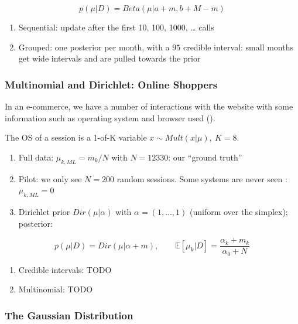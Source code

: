 \documentclass{article}
\begin{document}
\[p(\mu | D) = Beta(\mu | a + m, b + M - m)\]

\begin{enumerate}
\def\labelenumi{\arabic{enumi}.}
\setcounter{enumi}{3}
\item
  Sequential: update after the first 10, 100, 1000, \ldots{} calls
\item
  Grouped: one posterior per month, with a \(95%
  \) credible interval: small months get wide intervals and are pulled
  towards the prior
\end{enumerate}

\subsubsection{Multinomial and Dirichlet: Online
Shoppers}\label{multinomial-and-dirichlet-online-shoppers}

In an e-commerce, we have a number of interactions with the website with
some information such as operating system and browser used
().

The OS of a session is a 1-of-K variable
\(x \sim Mult(x | \mu),\ K = 8\).

\begin{enumerate}
\def\labelenumi{\arabic{enumi}.}
\item
  Full data: \(\mu_{k, ML} = m_k / N\) with \(N = 12330\): our ``ground
  truth''
\item
  Pilot: we only see \(N = 200\) random sessions. Some systems are never
  seen : \(\mu_{k, ML} = 0\)
\item
  Dirichlet prior \(Dir(\mu | \alpha)\) with \(\alpha = (1, ..., 1)\)
  (uniform over the simplex); posterior:
\end{enumerate}

\[p(\mu | D) = Dir(\mu | \alpha + m), \qquad \mathbb{E}[\mu_k | D] =
\frac{\alpha_k + m_k}{\alpha_0 + N}\]

\begin{enumerate}
\def\labelenumi{\arabic{enumi}.}
\setcounter{enumi}{3}
\item
  Credible intervals: TODO
\item
  Multinomial: TODO
\end{enumerate}

\subsubsection{The Gaussian
Distribution}\label{the-gaussian-distribution}
\end{document}
